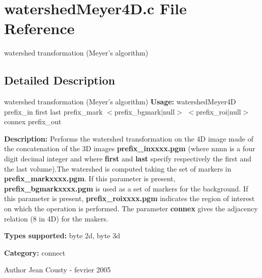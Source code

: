 \section{watershedMeyer4D.c File Reference}
\label{watershedMeyer4D_8c}


watershed transformation (Meyer's algorithm)  




\subsection{Detailed Description}
watershed transformation (Meyer's algorithm) {\bfseries Usage:} watershedMeyer4D prefix\_\-in first last prefix\_\-mark $<$prefix\_\-bgmark$|$null$>$ $<$prefix\_\-roi$|$null$>$ connex prefix\_\-out

{\bfseries Description:} Performs the watershed transformation on the 4D image made of the concatenation of the 3D images {\bfseries prefix\_\-inxxxx.pgm} (where nnnn is a four digit decimal integer and where {\bfseries first} and {\bfseries last} specify respectively the first and the last volume).The watershed is computed taking the set of markers in {\bfseries prefix\_\-markxxxx.pgm}. If this parameter is present, {\bfseries prefix\_\-bgmarkxxxx.pgm} is used as a set of markers for the background. If this parameter is present, {\bfseries prefix\_\-roixxxx.pgm} indicates the region of interest on which the operation is performed. The parameter {\bfseries connex} gives the adjacency relation (8 in 4D) for the makers.

{\bfseries Types supported:} byte 2d, byte 3d

{\bfseries Category:} connect

\begin{DoxyAuthor}{Author}
Jean Cousty -\/ fevrier 2005 
\end{DoxyAuthor}
